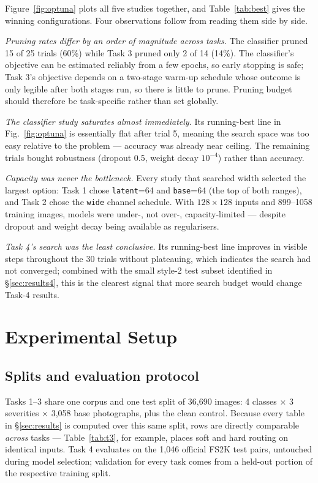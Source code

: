 \documentclass[journal]{IEEEtran}
\begin{document}
Figure~\ref{fig:optuna} plots all five studies together, and Table~\ref{tab:best} gives the winning configurations. Four observations follow from reading them side by side.

\emph{Pruning rates differ by an order of magnitude across tasks.} The classifier pruned 15 of 25 trials (60\%) while Task 3 pruned only 2 of 14 (14\%). The classifier's objective can be estimated reliably from a few epochs, so early stopping is safe; Task 3's objective depends on a two-stage warm-up schedule whose outcome is only legible after both stages run, so there is little to prune. Pruning budget should therefore be task-specific rather than set globally.

\emph{The classifier study saturates almost immediately.} Its running-best line in Fig.~\ref{fig:optuna} is essentially flat after trial 5, meaning the search space was too easy relative to the problem --- accuracy was already near ceiling. The remaining trials bought robustness (dropout 0.5, weight decay $10^{-4}$) rather than accuracy.

\emph{Capacity was never the bottleneck.} Every study that searched width selected the largest option: Task 1 chose \texttt{latent}=64 and \texttt{base}=64 (the top of both ranges), and Task 2 chose the \texttt{wide} channel schedule. With $128\times128$ inputs and 899--1058 training images, models were under-, not over-, capacity-limited --- despite dropout and weight decay being available as regularisers.

\emph{Task 4's search was the least conclusive.} Its running-best line improves in visible steps throughout the 30 trials without plateauing, which indicates the search had not converged; combined with the small style-2 test subset identified in \S\ref{sec:results4}, this is the clearest signal that more search budget would change Task-4 results.

\section{Experimental Setup}
\label{sec:setup}

\subsection{Splits and evaluation protocol}

Tasks 1--3 share one corpus and one test split of 36{,}690 images: 4 classes $\times$ 3 severities $\times$ 3{,}058 base photographs, plus the clean control. Because every table in \S\ref{sec:results} is computed over this same split, rows are directly comparable \emph{across} tasks --- Table~\ref{tab:t3}, for example, places soft and hard routing on identical inputs. Task 4 evaluates on the 1{,}046 official FS2K test pairs, untouched during model selection; validation for every task comes from a held-out portion of the respective training split.
\end{document}
